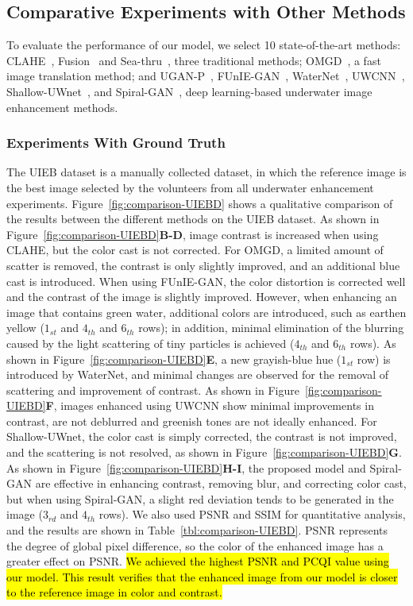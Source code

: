 \documentclass[utf8]{FrontiersinHarvard} %
\begin{document}
\subsection{Comparative Experiments with Other Methods}
To evaluate the performance of our model, we select 10 state-of-the-art methods: CLAHE~\citep{109340}, Fusion~\citep{2012Enhancing} and Sea-thru~\citep{akkaynak2019sea}, three traditional methods;  OMGD~\citep{ren2021online}, a fast image translation method; and UGAN-P~\citep{8460552}, FUnIE-GAN~\citep{9001231}, WaterNet~\citep{8917818}, UWCNN~\citep{2019Underwater1}, Shallow-UWnet~\citep{naik2021shallow}, and Spiral-GAN~\citep{2020Underwater}, deep learning-based underwater image enhancement methods.

\subsubsection{Experiments With Ground Truth}
The UIEB dataset is a manually collected dataset, in which the reference image is the best image selected by the volunteers from all underwater enhancement experiments. Figure~\ref{fig:comparison-UIEBD} shows a qualitative comparison of the results between the different methods on the UIEB dataset. As shown in Figure~\ref{fig:comparison-UIEBD}\textbf{B-D}, image contrast is increased when using CLAHE, but the color cast is not corrected. For OMGD, a limited amount of scatter is removed, the contrast is only slightly improved, and an additional blue cast is introduced. When using FUnIE-GAN, the color distortion is corrected well and the contrast of the image is slightly improved. However, when enhancing an image that contains green water, additional colors are introduced, such as earthen yellow ($1_{st}$ and $4_{th}$ and $6_{th}$ rows); in addition, minimal elimination of the blurring caused by the light scattering of tiny particles is achieved ($4_{th}$ and $6_{th}$ rows). As shown in Figure~\ref{fig:comparison-UIEBD}\textbf{E}, a new grayish-blue hue ($1_{st}$ row) is introduced by WaterNet, and minimal changes are observed for the removal of scattering and improvement of 
contrast. As shown in Figure~\ref{fig:comparison-UIEBD}\textbf{F}, images enhanced using UWCNN show minimal improvements in contrast, are not deblurred and greenish tones are not ideally enhanced.  For Shallow-UWnet, the color cast is simply corrected, the contrast is not improved, and the scattering is not resolved, as shown in Figure~\ref{fig:comparison-UIEBD}\textbf{G}. As shown in Figure~\ref{fig:comparison-UIEBD}\textbf{H-I}, the proposed model and Spiral-GAN are effective in enhancing contrast, removing blur, and correcting color cast, but when using Spiral-GAN, a slight red deviation tends to be generated in the image ($3_{rd}$ and $4_{th}$ rows). We also used PSNR and SSIM for quantitative analysis, and the results are shown in Table~\ref{tbl:comparison-UIEBD}. PSNR represents the degree of global pixel difference, so the color of the enhanced image has a greater effect on PSNR. \hl{We achieved the highest PSNR and PCQI value using our model. This result verifies that the enhanced image from our model is closer to the reference image in color and contrast.}
\end{document}
